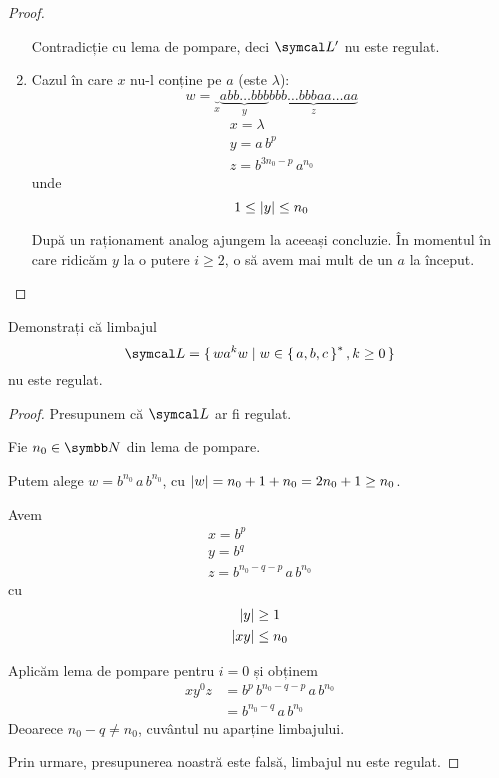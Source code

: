 \begin{proof}
\begin{enumerate}
              Contradicție cu lema de pompare, deci \(\limbaj'\) nu este regulat.

        \item Cazul în care \(x\) nu-l conține pe \(a\) (este \(\lambda\)):
              \[w = \underbrace{}_{x} \underbrace{a bb\dots{}bbb}_{y} \underbrace{bbb\dots{}bbb aa\dots{}aa}_{z}\]
              \begin{gather*}
                  x = \lambda \\
                  y = a \, b^p \\
                  z = b^{3 n_0 - p} \, a^{n_0}
              \end{gather*}
              unde
              \[1 \leq \left\lvert y\right\rvert \leq n_0\]

              După un raționament analog ajungem la aceeași concluzie. În momentul în care ridicăm \(y\) la o putere \(i \geq 2\), o să avem mai mult de un \(a\) la început.
    \end{enumerate}

\end{proof}

\begin{exercise}
    Demonstrați că limbajul
    \[\limbaj = \set{ w a^k w | w \in \set{a, b, c}^*, k \geq 0 }\]
    nu este regulat.
\end{exercise}
\begin{proof}
    Presupunem că \(\limbaj\) ar fi regulat.

    Fie \(n_0 \in \naturals\) din lema de pompare.

    Putem alege \(w = b^{n_0} \, a \, b^{n_0}\), cu \(\left\lvert w\right\rvert = n_0 + 1 + n_0 = 2 n_0 + 1 \geq n_0\).

    Avem
    \begin{gather*}
        x = b^{p} \\
        y = b^{q} \\
        z = b^{n_0 - q - p} \, a \, b^{n_0}
    \end{gather*}
    cu
    \begin{align*}
        \left\lvert y\right\rvert   & \geq 1   \\
        \left\lvert x y\right\rvert & \leq n_0
    \end{align*}

    Aplicăm lema de pompare pentru \(i = 0\) și obținem
    \begin{align*}
        x y^0 z & = b^p \, b^{n_0 - q - p} \, a \, b^{n_0} \\
                & = b^{n_0 - q} \, a \, b^{n_0}
    \end{align*}
    Deoarece \(n_0 - q \neq n_0\), cuvântul nu aparține limbajului.

    Prin urmare, presupunerea noastră este falsă, limbajul nu este regulat.
\end{proof}

